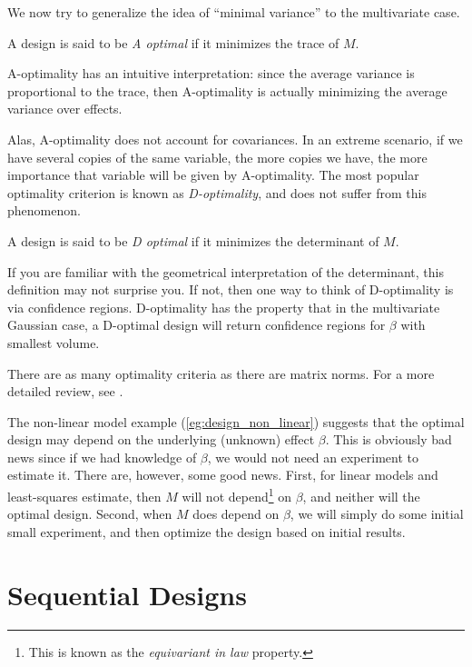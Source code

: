 We now try to generalize the idea of ``minimal variance'' to the multivariate case. 

\begin{definition}[A-Optimality]
	A design is said to be \emph{A optimal} if it minimizes the trace of $M$.
\end{definition}
A-optimality has an intuitive interpretation: since the average variance is proportional to the trace, then A-optimality is actually minimizing the average variance over effects.

Alas, A-optimality does not account for covariances. 
In an extreme scenario, if we have several copies of the same variable, the more copies we have, the more importance that variable will be given by A-optimality.
The most popular optimality criterion is known as \emph{D-optimality}, and does not suffer from this phenomenon.

\begin{definition}[D-Optimality]
	A design is said to be \emph{D optimal} if it minimizes the determinant of $M$.
\end{definition}
If you are familiar with the geometrical interpretation of the determinant, this definition may not surprise you. 
If not, then one way to think of D-optimality is via confidence regions.
D-optimality has the property that in the multivariate Gaussian case, a D-optimal design will return confidence regions for $\beta$ with smallest volume. 


\begin{extra}
There are as many optimality criteria as there are matrix norms. 
For a more detailed review, see \cite{wikipedia_optimal_2015}.
\end{extra}

The non-linear model example (\ref{eg:design_non_linear}) suggests that the optimal design may depend on the underlying (unknown) effect $\beta$. 
This is obviously bad news since if we had knowledge of $\beta$, we would not need an experiment to estimate it. 
There are, however, some good news.
First, for linear models and least-squares estimate, then $M$ will not depend\footnote{This is known as the \emph{equivariant in law} property.} on $\beta$, and neither will the optimal design. 
Second, when $M$ does depend on $\beta$, we will simply do some initial small experiment, and then optimize the design based on initial results. 



\section{Sequential Designs}
\label{sec:sequantial}

